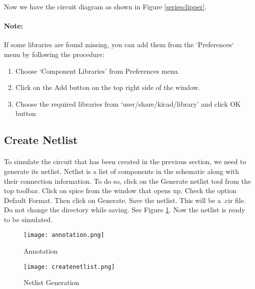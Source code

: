 Now we have the circuit diagram as shown in Figure \ref{seriesclipper}.


\paragraph{Note:} If some libraries are found missing, you can add them from the `Preferences` menu by following the procedure: 

\begin{enumerate}
\item
Choose `Component Libraries' from Preferences menu.

\item
Click on the Add button on the top right side of the window.

\item
Choose the required libraries from `user/share/kicad/library' and click OK button

\end{enumerate}

\subsection{Create Netlist}

\paragraph{}To simulate the circuit that has been created in the previous section, we need to generate
its netlist. Netlist is a list of components in the schematic along with their connection
information. To do so, click on the Generate netlist tool from the top toolbar. Click on
spice from the window that opens up. Check the option Default Format. Then click
on Generate. Save the netlist. This will be a .cir file. Do
not change the directory while saving. See Figure \ref{createnetlistclip}.
 Now the netlist is ready to be simulated. 
\begin{figure}
\begin{minipage}{.5\textwidth}
  \centering
  \texttt{[image: annotation.png]}
  \caption{Annotation}
  \label{annotationclip}
\end{minipage}%
\begin{minipage}{.5\textwidth}
  \centering
  \texttt{[image: createnetlist.png]}
  \caption{Netlist Generation}
  \label{createnetlistclip}
\end{minipage}
\end{figure}

